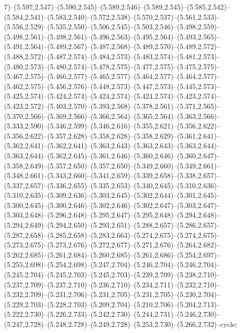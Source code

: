 7)--(5.597,2.547)--(5.590,2.545)--(5.589,2.546)--(5.589,2.545)--(5.585,2.542)--(5.584,2.541)--(5.583,2.540)--(5.572,2.538)--(5.570,2.537)--(5.561,2.533)--(5.556,2.529)--(5.535,2.550)--(5.506,2.545)--(5.503,2.546)--(5.498,2.559)--(5.498,2.561)--(5.498,2.561)--(5.496,2.563)--(5.495,2.564)--(5.493,2.565)--(5.491,2.564)--(5.489,2.567)--(5.487,2.568)--(5.489,2.570)--(5.489,2.572)--(5.488,2.572)--(5.487,2.574)--(5.484,2.573)--(5.483,2.574)--(5.481,2.573)--(5.480,2.573)--(5.480,2.574)--(5.478,2.575)--(5.477,2.575)--(5.475,2.575)--(5.467,2.575)--(5.466,2.577)--(5.465,2.577)--(5.464,2.577)--(5.464,2.577)--(5.462,2.575)--(5.456,2.576)--(5.448,2.573)--(5.447,2.573)--(5.445,2.573)--(5.425,2.574)--(5.424,2.574)--(5.424,2.574)--(5.424,2.574)--(5.423,2.574)--(5.423,2.572)--(5.403,2.570)--(5.393,2.568)--(5.378,2.561)--(5.371,2.565)--(5.370,2.566)--(5.369,2.566)--(5.366,2.564)--(5.365,2.564)--(5.363,2.566)--(5.333,2.590)--(5.346,2.599)--(5.346,2.616)--(5.355,2.621)--(5.356,2.622)--(5.356,2.622)--(5.357,2.628)--(5.358,2.628)--(5.358,2.629)--(5.361,2.641)--(5.362,2.641)--(5.362,2.641)--(5.363,2.643)--(5.363,2.643)--(5.363,2.644)--(5.363,2.644)--(5.362,2.645)--(5.361,2.646)--(5.360,2.646)--(5.360,2.647)--(5.358,2.649)--(5.357,2.650)--(5.357,2.650)--(5.349,2.660)--(5.349,2.661)--(5.348,2.661)--(5.343,2.660)--(5.341,2.659)--(5.339,2.658)--(5.338,2.657)--(5.337,2.657)--(5.336,2.655)--(5.335,2.653)--(5.340,2.645)--(5.310,2.636)--(5.310,2.635)--(5.309,2.636)--(5.303,2.645)--(5.302,2.644)--(5.301,2.645)--(5.300,2.645)--(5.300,2.646)--(5.302,2.646)--(5.302,2.647)--(5.303,2.647)--(5.303,2.648)--(5.296,2.648)--(5.295,2.647)--(5.295,2.648)--(5.294,2.648)--(5.294,2.649)--(5.294,2.650)--(5.293,2.651)--(5.288,2.657)--(5.286,2.657)--(5.287,2.658)--(5.285,2.658)--(5.283,2.663)--(5.274,2.675)--(5.274,2.675)--(5.273,2.675)--(5.273,2.676)--(5.272,2.677)--(5.271,2.676)--(5.264,2.682)--(5.262,2.685)--(5.261,2.684)--(5.260,2.685)--(5.261,2.686)--(5.254,2.697)--(5.255,2.698)--(5.254,2.698)--(5.247,2.704)--(5.246,2.704)--(5.246,2.704)--(5.245,2.704)--(5.245,2.703)--(5.245,2.703)--(5.239,2.709)--(5.238,2.710)--(5.237,2.709)--(5.237,2.710)--(5.236,2.710)--(5.234,2.711)--(5.232,2.710)--(5.232,2.709)--(5.231,2.706)--(5.231,2.705)--(5.231,2.705)--(5.230,2.704)--(5.229,2.703)--(5.228,2.703)--(5.209,2.704)--(5.210,2.706)--(5.204,2.713)--(5.222,2.730)--(5.226,2.733)--(5.242,2.730)--(5.244,2.731)--(5.246,2.730)--(5.247,2.728)--(5.248,2.728)--(5.249,2.728)--(5.253,2.730)--(5.266,2.732)--cycle;
